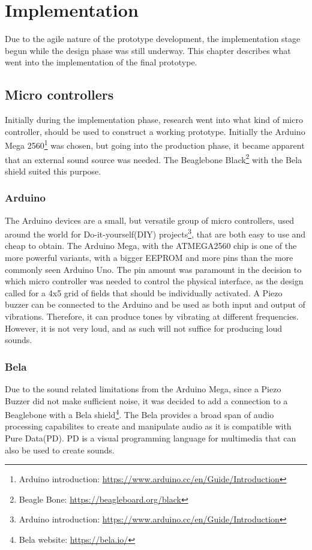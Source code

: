 \chapter{Implementation}\label{imp}
Due to the agile nature of the prototype development, the implementation stage begun while the design phase was still underway. This chapter describes what went into the implementation of the final prototype.

\section{Micro controllers}%
	Initially during the implementation phase, research went into what kind of micro controller, should be used to construct a working prototype. Initially the Arduino Mega 2560\footnote{Arduino introduction: \url{https://www.arduino.cc/en/Guide/Introduction}} was chosen, but going into the production phase, it became apparent that an external sound source was needed. The Beaglebone Black\footnote{Beagle Bone: \url{https://beagleboard.org/black}} with the Bela shield suited this purpose.
	\subsection{Arduino}%
		The Arduino devices are a small, but versatile group of micro controllers, used around the world for Do-it-yourself(DIY) projects\footnote{Arduino introduction: \url{https://www.arduino.cc/en/Guide/Introduction}}, that are both easy to use and cheap to obtain. The Arduino Mega, with the ATMEGA2560 chip is one of the more powerful variants, with a bigger EEPROM and more pins than the more commonly seen Arduino Uno. The pin amount was paramount in the decision to which micro controller was needed to control the physical interface, as the design called for a 4x5 grid of fields that should be individually activated. A Piezo buzzer can be connected to the Arduino and be used as both input and output of vibrations. Therefore, it can produce tones by vibrating at different frequencies. However, it is not very loud, and as such will not suffice for producing loud sounds.
		
	\subsection{Bela}%
		Due to the sound related limitations from the Arduino Mega, since a Piezo Buzzer did not make sufficient noise, it was decided to add a connection to a Beaglebone with a Bela shield\footnote{Bela website: \url{https://bela.io/}}. The Bela provides a broad span of audio processing capabilites to create and manipulate audio as it is compatible with Pure Data(PD). PD is a visual programming language for multimedia that can also be used to create sounds.
	
